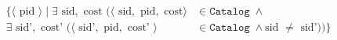 \begin{align*}
  \{\langle \text{ pid } \rangle 
    \mid \exists \text{ sid}, \text{ cost } 
    (\langle \text{ sid}, \text{ pid}, \text{ cost} \rangle 
      &\in \mathtt{Catalog} \; \wedge \\
       \exists \text{ sid'}, \text{ cost' } (
        \langle \text{ sid'}, \text{ pid}, \text{ cost' } \rangle 
    &\in \mathtt{Catalog} \; \wedge \text{sid } \neq \text{ sid'}))\}
\end{align*}


